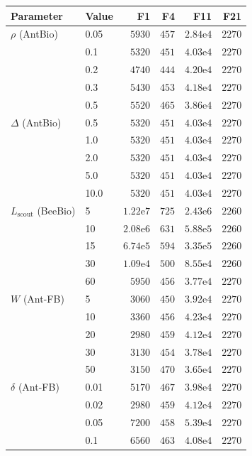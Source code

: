\begin{tabular}{llrrrr}
\toprule
Parameter & Value & F1 & F4 & F11 & F21 \\
\midrule
$\rho$ (AntBio) & 0.05 & $5930$ & $457$ & $2.84\mathrm{e}{4}$ & $2270$ \\
 & 0.1 & $5320$ & $451$ & $4.03\mathrm{e}{4}$ & $2270$ \\
 & 0.2 & $4740$ & $444$ & $4.20\mathrm{e}{4}$ & $2270$ \\
 & 0.3 & $5430$ & $453$ & $4.18\mathrm{e}{4}$ & $2270$ \\
 & 0.5 & $5520$ & $465$ & $3.86\mathrm{e}{4}$ & $2270$ \\
\midrule
$\Delta$ (AntBio) & 0.5 & $5320$ & $451$ & $4.03\mathrm{e}{4}$ & $2270$ \\
 & 1.0 & $5320$ & $451$ & $4.03\mathrm{e}{4}$ & $2270$ \\
 & 2.0 & $5320$ & $451$ & $4.03\mathrm{e}{4}$ & $2270$ \\
 & 5.0 & $5320$ & $451$ & $4.03\mathrm{e}{4}$ & $2270$ \\
 & 10.0 & $5320$ & $451$ & $4.03\mathrm{e}{4}$ & $2270$ \\
\midrule
$L_{\mathrm{scout}}$ (BeeBio) & 5 & $1.22\mathrm{e}{7}$ & $725$ & $2.43\mathrm{e}{6}$ & $2260$ \\
 & 10 & $2.08\mathrm{e}{6}$ & $631$ & $5.88\mathrm{e}{5}$ & $2260$ \\
 & 15 & $6.74\mathrm{e}{5}$ & $594$ & $3.35\mathrm{e}{5}$ & $2260$ \\
 & 30 & $1.09\mathrm{e}{4}$ & $500$ & $8.55\mathrm{e}{4}$ & $2260$ \\
 & 60 & $5950$ & $456$ & $3.77\mathrm{e}{4}$ & $2270$ \\
\midrule
$W$ (Ant-FB) & 5 & $3060$ & $450$ & $3.92\mathrm{e}{4}$ & $2270$ \\
 & 10 & $3360$ & $456$ & $4.23\mathrm{e}{4}$ & $2270$ \\
 & 20 & $2980$ & $459$ & $4.12\mathrm{e}{4}$ & $2270$ \\
 & 30 & $3130$ & $454$ & $3.78\mathrm{e}{4}$ & $2270$ \\
 & 50 & $3150$ & $470$ & $3.65\mathrm{e}{4}$ & $2270$ \\
\midrule
$\delta$ (Ant-FB) & 0.01 & $5170$ & $467$ & $3.98\mathrm{e}{4}$ & $2270$ \\
 & 0.02 & $2980$ & $459$ & $4.12\mathrm{e}{4}$ & $2270$ \\
 & 0.05 & $7200$ & $458$ & $5.39\mathrm{e}{4}$ & $2270$ \\
 & 0.1 & $6560$ & $463$ & $4.08\mathrm{e}{4}$ & $2270$ \\

\end{tabular}
